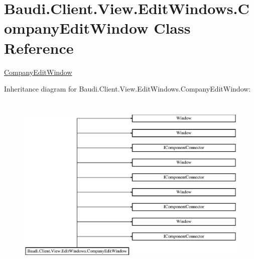 \hypertarget{class_baudi_1_1_client_1_1_view_1_1_edit_windows_1_1_company_edit_window}{}\section{Baudi.\+Client.\+View.\+Edit\+Windows.\+Company\+Edit\+Window Class Reference}
\label{class_baudi_1_1_client_1_1_view_1_1_edit_windows_1_1_company_edit_window}


\hyperlink{class_baudi_1_1_client_1_1_view_1_1_edit_windows_1_1_company_edit_window}{Company\+Edit\+Window}  


Inheritance diagram for Baudi.\+Client.\+View.\+Edit\+Windows.\+Company\+Edit\+Window\+:\begin{figure}[H]
\begin{center}
\leavevmode
\includegraphics[height=8.832808cm]{class_baudi_1_1_client_1_1_view_1_1_edit_windows_1_1_company_edit_window}
\end{center}
\end{figure}
